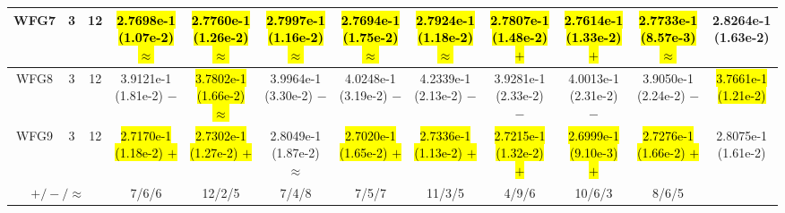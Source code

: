 \documentclass[journal]{IEEEtran}
\begin{document}
\begin{table*}[htbp]
\begin{tabular}{cccccccccccc}
\hline
\multirow{1}{*}{WFG7}&3&12&\hl{2.7698e-1 (1.07e-2) $\approx$}&\hl{2.7760e-1 (1.26e-2) $\approx$}&\hl{2.7997e-1 (1.16e-2) $\approx$}&\hl{2.7694e-1 (1.75e-2) $\approx$}&\hl{2.7924e-1 (1.18e-2) $\approx$}&\hl{2.7807e-1 (1.48e-2) $+$}&\hl{2.7614e-1 (1.33e-2) $+$}&\hl{2.7733e-1 (8.57e-3) $\approx$}&2.8264e-1 (1.63e-2)\\
\hline
\multirow{1}{*}{WFG8}&3&12&3.9121e-1 (1.81e-2) $-$&\hl{3.7802e-1 (1.66e-2) $\approx$}&3.9964e-1 (3.30e-2) $-$&4.0248e-1 (3.19e-2) $-$&4.2339e-1 (2.13e-2) $-$&3.9281e-1 (2.33e-2) $-$&4.0013e-1 (2.31e-2) $-$&3.9050e-1 (2.24e-2) $-$&\hl{3.7661e-1 (1.21e-2)}\\
\hline
\multirow{1}{*}{WFG9}&3&12&\hl{2.7170e-1 (1.18e-2) $+$}&\hl{2.7302e-1 (1.27e-2) $+$}&2.8049e-1 (1.87e-2) $\approx$&\hl{2.7020e-1 (1.65e-2) $+$}&\hl{2.7336e-1 (1.13e-2) $+$}&\hl{2.7215e-1 (1.32e-2) $+$}&\hl{2.6999e-1 (9.10e-3) $+$}&\hl{2.7276e-1 (1.66e-2) $+$}&2.8075e-1 (1.61e-2)\\
\hline
\multicolumn{3}{c}{$+/-/\approx$}&7/6/6&12/2/5&7/4/8&7/5/7&11/3/5&4/9/6&10/6/3&8/6/5&\\
\bottomrule
\end{tabular}
\label{No Label}
\end{table*}
\end{document}
